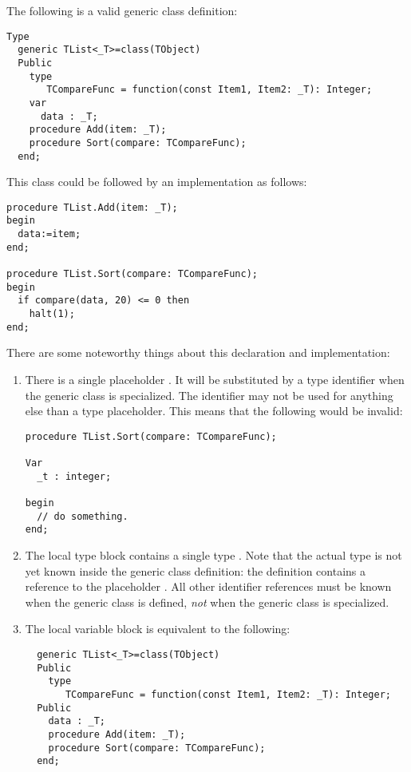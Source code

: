 The following is a valid generic class definition:
\begin{verbatim}
Type
  generic TList<_T>=class(TObject)
  Public 
    type 
       TCompareFunc = function(const Item1, Item2: _T): Integer;
    var 
      data : _T;
    procedure Add(item: _T);
    procedure Sort(compare: TCompareFunc);
  end;
\end{verbatim}
This class could be followed by an implementation as follows:
\begin{verbatim}
procedure TList.Add(item: _T);
begin
  data:=item;
end;

procedure TList.Sort(compare: TCompareFunc);
begin
  if compare(data, 20) <= 0 then
    halt(1);
end;
\end{verbatim}
There are some noteworthy things about this declaration and implementation:
\begin{enumerate}
\item There is a single placeholder . It will be substituted by a
type identifier when the generic class is specialized. The identifier
 may not be used for anything else than a type placeholder. 
This means that the following would be invalid:
\begin{verbatim}
procedure TList.Sort(compare: TCompareFunc);

Var
  _t : integer;

begin
  // do something.
end;
\end{verbatim}
\item The local type block contains a single type . Note
that the actual type is not yet known inside the generic class definition:
the definition contains a reference to the placeholder . All other
identifier references must be known when the generic class is defined, {\em not}
when the generic class is specialized.
\item The local variable block is equivalent to the following:
\begin{verbatim}
  generic TList<_T>=class(TObject)
  Public
    type 
       TCompareFunc = function(const Item1, Item2: _T): Integer;
  Public  
    data : _T;
    procedure Add(item: _T);
    procedure Sort(compare: TCompareFunc);
  end;
\end{verbatim}
\end{enumerate}

